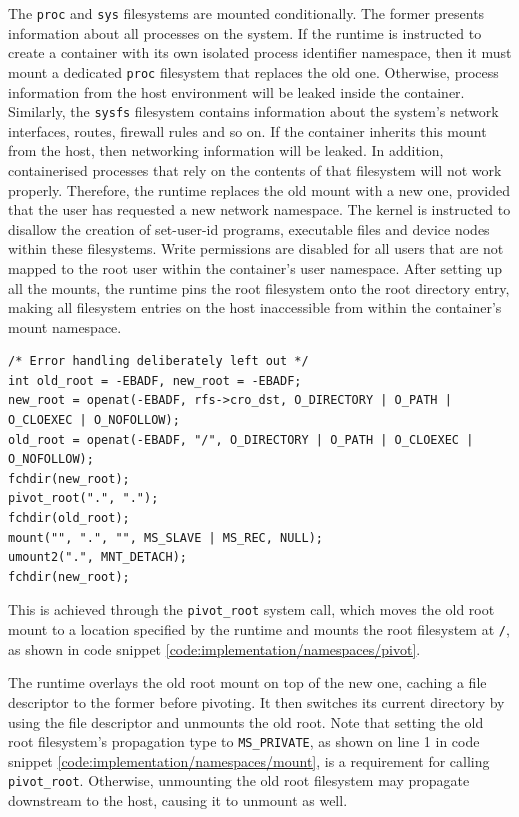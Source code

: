 The \verb|proc| and \verb|sys| filesystems are mounted conditionally. The former presents information
about all processes on the system. If the runtime is instructed to create a container with 
its own isolated process identifier namespace, then it must mount a dedicated \verb|proc|
filesystem that replaces the old one. Otherwise, process information from the host environment 
will be leaked inside the container. Similarly, the \verb|sysfs| filesystem contains information 
about the system's network interfaces, routes, firewall rules and so on. If the container inherits 
this mount from the host, then networking information will be leaked. In addition, containerised 
processes that rely on the contents of that filesystem will not work properly. Therefore, 
the runtime replaces the old mount with a new one, provided that the user has requested a 
new network namespace. The kernel is instructed to disallow the creation of set-user-id programs,
executable files and device nodes within these filesystems. Write permissions are disabled 
for all users that are not mapped to the root user within the container's user namespace. 
After setting up all the mounts, the runtime pins the root filesystem onto the 
root directory entry, making all filesystem entries on the host inaccessible from within the container's mount namespace.
\begin{lstlisting}[style=c-code-snippets, label={code:implementation/namespaces/pivot}, caption={Swap the old root filesystem with a new one}]
/* Error handling deliberately left out */
int old_root = -EBADF, new_root = -EBADF;
new_root = openat(-EBADF, rfs->cro_dst, O_DIRECTORY | O_PATH | O_CLOEXEC | O_NOFOLLOW);
old_root = openat(-EBADF, "/", O_DIRECTORY | O_PATH | O_CLOEXEC | O_NOFOLLOW);
fchdir(new_root);
pivot_root(".", ".");
fchdir(old_root);
mount("", ".", "", MS_SLAVE | MS_REC, NULL);
umount2(".", MNT_DETACH);
fchdir(new_root);
\end{lstlisting}
This is achieved through the \verb|pivot_root| system call, which moves 
the old root mount to a location specified by the runtime and mounts the root filesystem at \verb|/|,
as shown in code snippet \ref{code:implementation/namespaces/pivot}.

The runtime overlays the old root mount on top of the new one, caching a file descriptor to the former 
before pivoting. It then switches its current directory by using the file descriptor and unmounts
the old root. 
Note that setting 
the old root filesystem's propagation type to \verb|MS_PRIVATE|, as shown on line 1 in code snippet 
\ref{code:implementation/namespaces/mount}, is a requirement for calling \verb|pivot_root|.
Otherwise, unmounting the old root filesystem may propagate downstream to the host, causing it to 
unmount as well.

